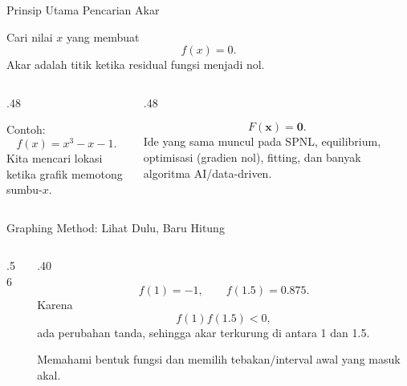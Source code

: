 \documentclass[aspectratio=169,10pt]{beamer}
\begin{document}
\begin{frame}{Prinsip Utama Pencarian Akar}
\small
\begin{bluebox}[Masalah]
Cari nilai \(x\) yang membuat
\[
f(x)=0.
\]
Akar adalah titik ketika residual fungsi menjadi nol.
\end{bluebox}
\begin{columns}[T,totalwidth=\textwidth]
\begin{column}{.48\textwidth}
\begin{greenbox}
Contoh:
\[
f(x)=x^3-x-1.
\]
Kita mencari lokasi ketika grafik memotong sumbu-\(x\).
\end{greenbox}
\end{column}
\begin{column}{.48\textwidth}
\begin{orangebox}
\[
F(\mathbf{x})=\mathbf{0}.
\]
Ide yang sama muncul pada SPNL, equilibrium, optimisasi (gradien nol), fitting, dan banyak algoritma AI/data-driven.
\end{orangebox}
\end{column}
\end{columns}
\end{frame}

\begin{frame}{Graphing Method: Lihat Dulu, Baru Hitung}
\scriptsize
\begin{columns}[T,totalwidth=\textwidth]
\begin{column}{.56\textwidth}
\end{column}
\begin{column}{.40\textwidth}
\begin{bluebox}
\[
f(1)=-1,\qquad f(1.5)=0.875.
\]
Karena
\[
f(1)f(1.5)<0,
\]
ada perubahan tanda, sehingga akar terkurung di antara 1 dan 1.5.
\end{bluebox}
\begin{goldbox}
Memahami bentuk fungsi dan memilih tebakan/interval awal yang masuk akal.
\end{goldbox}
\end{column}
\end{columns}
\end{frame}
\end{document}
